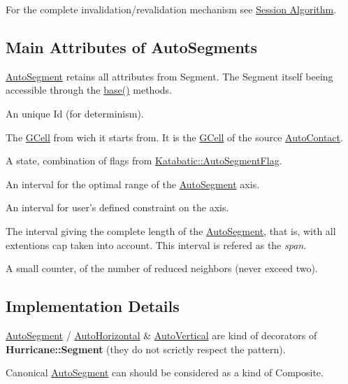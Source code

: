 For the complete invalidation/revalidation mechanism see \hyperlink{classKatabatic_1_1Session_secSessionAlgo}{Session Algorithm}.\hypertarget{classKatabatic_1_1AutoSegment_secASAttributes}{}\subsection{Main Attributes of Auto\-Segments}\label{classKatabatic_1_1AutoSegment_secASAttributes}
\hyperlink{classKatabatic_1_1AutoSegment}{Auto\-Segment} retains all attributes from Segment. The Segment itself beeing accessible through the \hyperlink{classKatabatic_1_1AutoSegment_ade416d0483aefe986988fa89a7cf6fcf}{base()} methods. 
\begin{DoxyItemize}
\item An unique {\ttfamily Id} (for determinism). 
\item The \hyperlink{classKatabatic_1_1GCell}{G\-Cell} from wich it starts from. It is the \hyperlink{classKatabatic_1_1GCell}{G\-Cell} of the source \hyperlink{classKatabatic_1_1AutoContact}{Auto\-Contact}. 
\item A state, combination of flags from \hyperlink{namespaceKatabatic_a94585537ee1724ea9315578ec54380f4}{Katabatic\-::\-Auto\-Segment\-Flag}. 
\item An interval for the optimal range of the \hyperlink{classKatabatic_1_1AutoSegment}{Auto\-Segment} axis. 
\item An interval for user's defined constraint on the axis. 
\item The interval giving the complete length of the \hyperlink{classKatabatic_1_1AutoSegment}{Auto\-Segment}, that is, with all extentions cap taken into account. This interval is refered as the {\itshape span}. 
\item A small counter, of the number of reduced neighbors (never exceed two). 
\end{DoxyItemize}\hypertarget{classKatabatic_1_1AutoSegment_secASImplementation}{}\subsection{Implementation Details}\label{classKatabatic_1_1AutoSegment_secASImplementation}
\hyperlink{classKatabatic_1_1AutoSegment}{Auto\-Segment} / \hyperlink{classKatabatic_1_1AutoHorizontal}{Auto\-Horizontal} \& \hyperlink{classKatabatic_1_1AutoVertical}{Auto\-Vertical} are kind of decorators of {\bf Hurricane\-::\-Segment} (they do not scrictly respect the pattern).

Canonical \hyperlink{classKatabatic_1_1AutoSegment}{Auto\-Segment} can should be considered as a kind of Composite.

